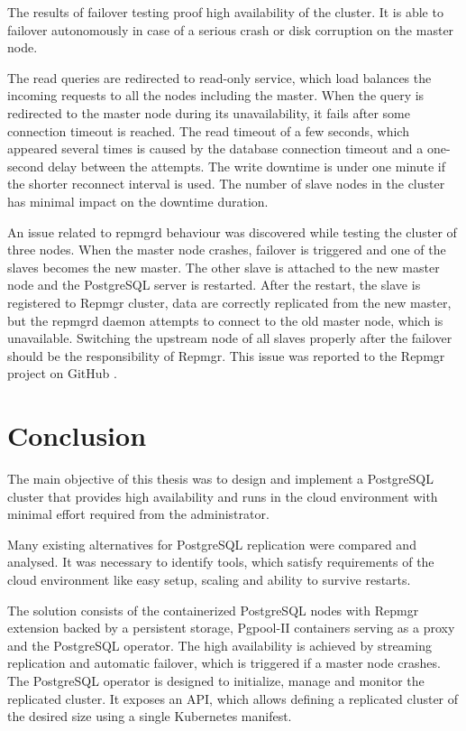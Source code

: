 \documentclass[
  digital, %
  twoside, %
  table,   %
  lof,     %
  lot,     %
]{fithesis3}
\begin{document}
The results of failover testing proof high availability of the cluster. It is able to failover autonomously in case of a serious crash or disk corruption on the master node.

The read queries are redirected to read-only service, which load balances the incoming requests to all the nodes including the master. When the query is redirected to the master node during its unavailability, it fails after some connection timeout is reached.
The read timeout of a few seconds, which appeared several times is caused by the database connection timeout and a one-second delay between the attempts. The write downtime is under one minute if the shorter reconnect interval is used. The number of slave nodes in the cluster has minimal impact on the downtime duration.

An issue related to repmgrd behaviour was discovered while testing the cluster of three nodes. When the master node crashes, failover is triggered and one of the slaves becomes the new master. The other slave is attached to the new master node and the PostgreSQL server is restarted. After the restart, the slave is registered to Repmgr cluster, data are correctly replicated from the new master, but the repmgrd daemon attempts to connect to the old master node, which is unavailable. Switching the upstream node of all slaves properly after the failover should be the responsibility of Repmgr. This issue was reported to the Repmgr project on GitHub \cite{repmgrd_issue}.


\chapter{Conclusion} \label{chap:conclusion}
The main objective of this thesis was to design and implement a PostgreSQL cluster that provides high availability and runs in the cloud environment with minimal effort required from the administrator.

Many existing alternatives for PostgreSQL replication were compared and analysed. It was necessary to identify tools, which satisfy requirements of the cloud environment like easy setup, scaling and ability to survive restarts.

The solution consists of the containerized PostgreSQL nodes with Repmgr extension backed by a persistent storage, Pgpool-II containers serving as a proxy and the PostgreSQL operator. The high availability is achieved by streaming replication and automatic failover, which is triggered if a master node crashes. The PostgreSQL operator is designed to initialize, manage and monitor the replicated cluster. It exposes an API, which allows defining a replicated cluster of the desired size using a single Kubernetes manifest.
\end{document}
